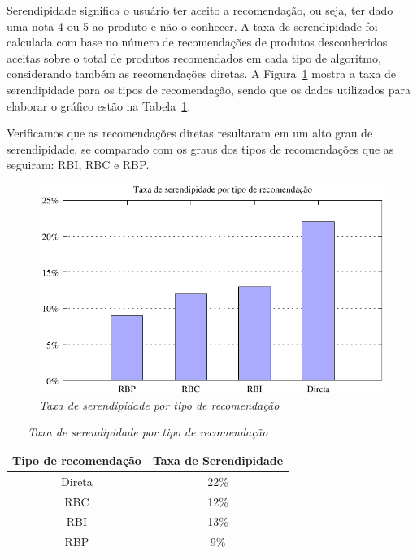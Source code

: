 Serendipidade significa o usuário ter aceito a recomendação, ou seja, ter dado uma nota 4 ou 5 ao produto e não o conhecer. A taxa de serendipidade foi calculada com base no número de recomendações de produtos desconhecidos aceitas sobre o total de produtos recomendados em cada tipo de algoritmo, considerando também as recomendações diretas. A Figura~\ref{fig:serendipidade} mostra a taxa de serendipidade para os tipos de recomendação, sendo que os dados utilizados para elaborar o gráfico estão na Tabela~\ref{table:serendipidade}.

Verificamos que as recomendações diretas resultaram em um alto grau de serendipidade, se comparado com os graus dos tipos de recomendações que as seguiram: RBI, RBC e RBP.

\begin{figure}
    \centering
    \includegraphics[width=\textwidth]{imagens/grafico_serendipidade}
    \caption{\it Taxa de serendipidade por tipo de recomendação}
    \label{fig:serendipidade}
\end{figure}

\begin{table}
\centering
\begin{tabular}{c c}
    \hline \hline
    \textbf{Tipo de recomendação} & \textbf{Taxa de Serendipidade} \\
\hline 
Direta & 22\% \\
\hline 
RBC & 12\% \\
\hline 
RBI & 13\% \\
\hline 
RBP & 9\% \\
\hline        
\end{tabular}
\caption{\it Taxa de serendipidade por tipo de recomendação}
\label{table:serendipidade}
\end{table}

